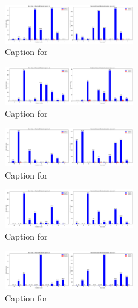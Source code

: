 \documentclass[12pt, a4paper]{article}
\begin{document}
\begin{figure}[ht]
\centering
\includegraphics[width=0.5\textwidth]{combined_class_boundary_pgd/combined_class_9_misclassifications_eps_0.1.png}
\caption{Caption for }
\label{fig:combined_class_9_misclassifications_eps_0.1.png}
\end{figure}

\begin{figure}[ht]
\centering
\includegraphics[width=0.5\textwidth]{combined_class_boundary_pgd/combined_class_0_misclassifications_eps_0.2.png}
\caption{Caption for }
\label{fig:combined_class_0_misclassifications_eps_0.2.png}
\end{figure}

\begin{figure}[ht]
\centering
\includegraphics[width=0.5\textwidth]{combined_class_boundary_pgd/combined_class_2_misclassifications_eps_0.2.png}
\caption{Caption for }
\label{fig:combined_class_2_misclassifications_eps_0.2.png}
\end{figure}

\begin{figure}[ht]
\centering
\includegraphics[width=0.5\textwidth]{combined_class_boundary_pgd/combined_class_1_misclassifications_eps_0.2.png}
\caption{Caption for }
\label{fig:combined_class_1_misclassifications_eps_0.2.png}
\end{figure}

\begin{figure}[ht]
\centering
\includegraphics[width=0.5\textwidth]{combined_class_boundary_pgd/combined_class_3_misclassifications_eps_0.2.png}
\caption{Caption for }
\label{fig:combined_class_3_misclassifications_eps_0.2.png}
\end{figure}
\end{document}
